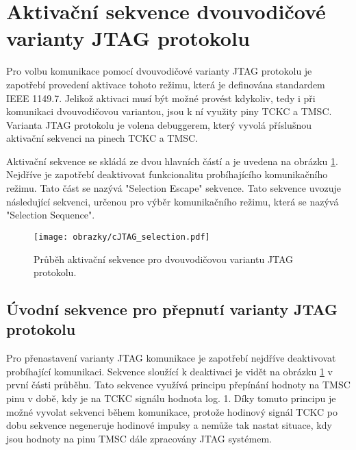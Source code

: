 
\section{Aktivační sekvence dvouvodičové varianty \acs{JTAG} protokolu}
Pro volbu komunikace pomocí dvouvodičové varianty \acs{JTAG} protokolu je zapotřebí provedení aktivace tohoto režimu, která je definována standardem IEEE 1149.7. Jelikož aktivaci musí být možné provést kdykoliv, tedy i při komunikaci dvouvodičovou variantou, jsou k ní využity piny \acs{TCKC} a \acs{TMSC}. Varianta \acs{JTAG} protokolu je volena debuggerem, který vyvolá příslušnou aktivační sekvenci na pinech \acs{TCKC} a \acs{TMSC}. \cite{IEEE_1149-7}

Aktivační sekvence se skládá ze dvou hlavních částí a je uvedena na obrázku \ref{fig:cJTAG_sel}. Nejdříve je zapotřebí deaktivovat funkcionalitu probíhajícího komunikačního režimu. Tato část se nazývá "Selection Escape" sekvence. Tato sekvence uvozuje následující sekvenci, určenou pro výběr komunikačního režimu, která se nazývá "Selection Sequence". \cite{IEEE_1149-7}

\begin{figure}[!h]
  \begin{center}
    \texttt{[image: obrazky/cJTAG\_selection.pdf]}
  \end{center}
  \caption{Průběh aktivační sekvence pro dvouvodičovou variantu \acs{JTAG} protokolu.}
	\label{fig:cJTAG_sel}
\end{figure}

\subsection{Úvodní sekvence pro přepnutí varianty \acs{JTAG} protokolu}	\label{subsec:sel_escape}
Pro přenastavení varianty \acs{JTAG} komunikace je zapotřebí nejdříve deaktivovat probíhající komunikaci. Sekvence sloužící k deaktivaci je vidět na obrázku \ref{fig:cJTAG_sel} v první části průběhu. Tato sekvence využívá principu přepínání hodnoty na \acs{TMSC} pinu v době, kdy je na \acs{TCKC} signálu hodnota log. 1. Díky tomuto principu je možné vyvolat sekvenci během komunikace, protože hodinový signál \acs{TCKC} po dobu sekvence negeneruje hodinové impulsy a nemůže tak nastat situace, kdy jsou hodnoty na pinu \acs{TMSC} dále zpracovány \acs{JTAG} systémem. \cite{IEEE_1149-7}


